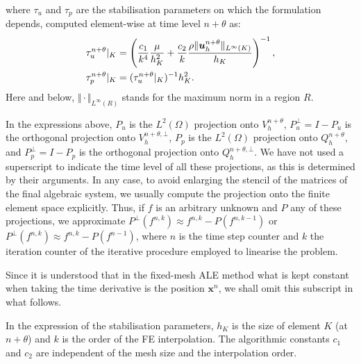 \documentclass[11pt,a4paper,oneside,reqno]{amsart}
\def\x{{\bm x}}
\def\u{{\bm u}}
\def\cl{\nonumber\\}
\def\el{{\nonumber}}
\begin{document}
where $\tau_u$ and $\tau_p$ are the stabilisation parameters on which the formulation depends, computed element-wise at time level $n+\theta$ as:
\begin{align}
\tau_u^{n+\theta} \vert_K & = \left( \frac{c_1}{k^4} \frac{\mu}{h_K^2} +  \frac{c_2}{k} \frac{\rho\Vert \u_h^{n+\theta}%
\Vert_{L^\infty(K)}}{h_K}  \right)^{-1},\cl
\tau_p^{n+\theta} \vert_K & = (\tau_u^{n+\theta} \vert_K )^{-1} h_K^2.\el
\end{align}
Here and below, $\Vert\cdot\Vert_{L^\infty(R)}$ stands for the maximum norm in a region $R$.

In the expressions above, $P_u$ is the $L^2(\Omega)$ projection onto $V_h^{n+\theta}$,  $P_u^\bot = I - P_u$ is the orthogonal projection onto $V_h^{n+\theta,\bot}$, $P_p$ is the $L^2(\Omega)$ projection onto $Q_h^{n+\theta}$,  and $P_p^\bot = I - P_p$ is the orthogonal projection onto $Q_h^{n+\theta,\bot}$. We have not used a superscript to indicate the time level of all these projections, as this is determined by their arguments. In any case, to avoid enlarging the stencil of the matrices of the final algebraic system, we usually compute the projection onto the finite element space explicitly. Thus, if $f$ is an arbitrary unknown and $P$ any of these projections, we approximate $P^\bot (f^{n,k}) \approx f^{n,k} - P(f^{n,k-1})$ or $P^\bot (f^{n,k}) \approx f^{n,k} - P(f^{n-1})$, where $n$ is the time step counter and $k$ the iteration counter of the iterative procedure employed to linearise the problem.

Since it is understood that in the fixed-mesh ALE method what is kept constant when taking the time derivative is the position $\x^n$, we shall omit this subscript in what follows. 

In the expression of the stabilisation parameters, $h_K$ is the size of element $K$ (at $n+\theta$) and $k$ is the order of the FE interpolation. The algorithmic constants $c_1$ and $c_2$ are independent of the mesh size and the interpolation order. %
\end{document}
